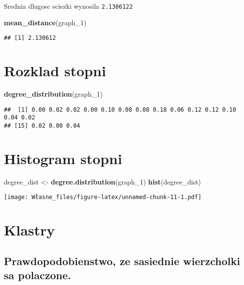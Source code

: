 \documentclass[]{article}
\newenvironment{Shaded}{\begin{snugshade}}{\end{snugshade}}
\newcommand{\KeywordTok}[1]{\textcolor[rgb]{0.13,0.29,0.53}{\textbf{#1}}}
\newcommand{\DecValTok}[1]{\textcolor[rgb]{0.00,0.00,0.81}{#1}}
\newcommand{\StringTok}[1]{\textcolor[rgb]{0.31,0.60,0.02}{#1}}
\newcommand{\NormalTok}[1]{#1}
\begin{document}
Srednia dlugosc sciezki wynosila \texttt{2.1306122}

\begin{Shaded}
\begin{Highlighting}[]
\KeywordTok{mean_distance}\NormalTok{(graph_}\DecValTok{1}\NormalTok{)}
\end{Highlighting}
\end{Shaded}

\begin{verbatim}
## [1] 2.130612
\end{verbatim}

\section{Rozklad stopni}\label{rozklad-stopni}

\begin{Shaded}
\begin{Highlighting}[]
\KeywordTok{degree_distribution}\NormalTok{(graph_}\DecValTok{1}\NormalTok{)}
\end{Highlighting}
\end{Shaded}

\begin{verbatim}
##  [1] 0.00 0.02 0.02 0.00 0.10 0.08 0.08 0.18 0.06 0.12 0.12 0.10 0.04 0.02
## [15] 0.02 0.00 0.04
\end{verbatim}

\section{Histogram stopni}\label{histogram-stopni}

\begin{Shaded}
\begin{Highlighting}[]
\NormalTok{degree_dist <-}\StringTok{ }\KeywordTok{degree.distribution}\NormalTok{(graph_}\DecValTok{1}\NormalTok{)}
\KeywordTok{hist}\NormalTok{(degree_dist)}
\end{Highlighting}
\end{Shaded}

\texttt{[image: Własne\_files/figure-latex/unnamed-chunk-11-1.pdf]}

\section{Klastry}\label{klastry}

\subsection{Prawdopodobienstwo, ze sasiednie wierzcholki sa
polaczone.}\label{prawdopodobienstwo-ze-sasiednie-wierzcholki-sa-polaczone.}
\end{document}
